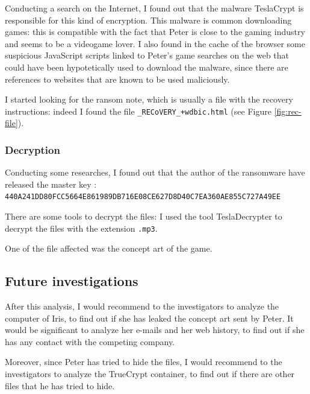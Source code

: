 \documentclass[12pt]{article}
\begin{document}
Conducting a search on the Internet, I found out that the malware TeslaCrypt is responsible for this kind of encryption. This malware is common downloading games: this is compatible with the fact that Peter is close to the gaming industry and seems to be a videogame lover. I also found in the cache of the browser some suspicious JavaScript scripts linked to Peter's game searches on the web that could have been hypotetically used to download the malware, since there are references to websites that are known to be used maliciously.

I started looking for the ransom note, which is usually a file with the recovery instructions: indeed I found the file \texttt{\_RECoVERY\_+wdbic.html} (see Figure \ref{fig:rec-file}).

\subsubsection{Decryption}
Conducting some researches, I found out that the author of the ransomware have released the master key \cite{teslacrypt-masterkey}: \\
\texttt{440A241DD80FCC5664E861989DB716E08CE627D8D40C7EA360AE855C727A49EE}

There are some tools to decrypt the files: I used the tool TeslaDecrypter \cite{tesla-decrypt} to decrypt the files with the extension \texttt{.mp3}.

One of the file affected was the concept art of the game.

\subsection{Future investigations}

After this analysis, I would recommend to the investigators to analyze the computer of Iris, to find out if she has leaked the concept art sent by Peter. It would be significant to analyze her e-mails and her web history, to find out if she has any contact with the competing company.

Moreover, since Peter has tried to hide the files, I would recommend to the investigators to analyze the TrueCrypt container, to find out if there are other files that he has tried to hide.

\printbibliography[title={References}]
\end{document}
